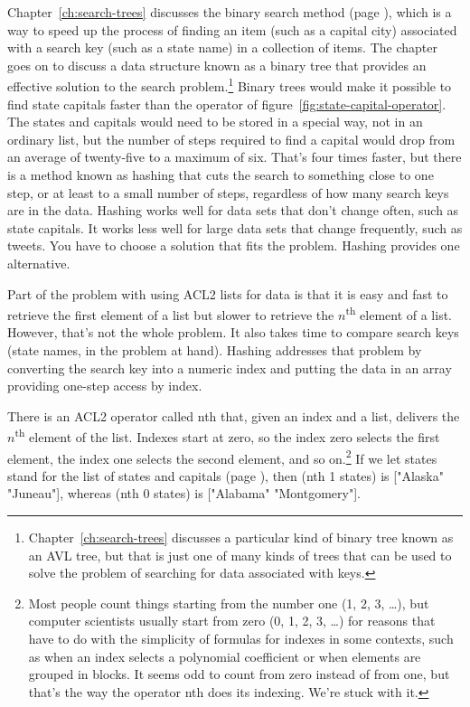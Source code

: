 Chapter~\ref{ch:search-trees} discusses the binary search
method (page \pageref{binary-search-method}),
which is a way to speed up the process of finding an item
(such as a capital city)
associated with a search key (such as a state name) in a
collection of items. The chapter goes on to discuss
a data structure known as a binary tree
that provides an effective solution to the search
problem.\footnote{Chapter~\ref{ch:search-trees}
discusses a particular kind of binary tree known as an AVL tree,
but that is just one of many kinds of trees
that can be used to solve the problem of searching
for data associated with keys.}
Binary trees would make it possible to find
state capitals faster
than the operator of figure~\ref{fig:state-capital-operator}.
The states and capitals would need to be stored
in a special way, not in an ordinary list,
but the number of steps required to find a capital
would drop from an average of twenty-five to a maximum of six.
That's four times faster, but there is a method known as hashing %
that cuts the search to something close to one step, or at least
to a small number of steps, regardless of how
many search keys are in the data.
Hashing works well for data sets that don't change often, %
such as state capitals. It works less well for large
data sets that change frequently, such as tweets.
You have to choose a solution that fits the problem.
Hashing provides one alternative.

Part of the problem with using ACL2 lists
for data is that it is easy and fast to retrieve the
first element of a list but slower to retrieve the
$n$\textsuperscript{th} element of a list.
However, that's not the whole problem. %
It also takes time to compare search keys
(state names, in the problem at hand).
Hashing addresses that problem by converting the search key
into a numeric index and putting the data
in an array providing one-step access by index.

There is an ACL2 operator called \textsf{nth} that,
given an index and a list, delivers the
$n$\textsuperscript{th} element of the list.
Indexes start at zero, so the index
zero selects the first element,
the index one selects the second element,
and so on.\footnote{Most people
count things starting from the number one (1, 2, 3, \dots), but
computer scientists usually start from zero (0, 1, 2, 3, \dots)
for reasons that have to do with the simplicity
of formulas for indexes in some contexts, such
as when an index selects a polynomial coefficient
or when elements are grouped in blocks.
It seems odd to count from
zero instead of from one,
but that's the way the operator
\textsf{nth} does its indexing. We're stuck with it.}
If we let \textsf{states} stand for the list of states and capitals
(page \pageref{states-capitals-list}), then
\textsf{(nth 1 states)} is \textsf{["Alaska" "Juneau"]},
whereas \textsf{(nth 0 states)} is \textsf{["Alabama" "Montgomery"]}.

